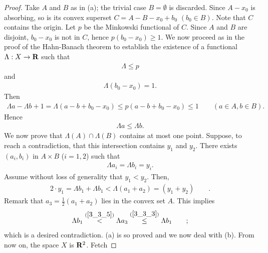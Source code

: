 \begin{proof}%
Take $A$ and $B$ as in (a); the trivial case $B=\emptyset$ is discarded. %
Since $A-x_0$ is absorbing, so is its convex superset %
%
  $C= A-B - x_0 + b_0$ $(b_0 \in B)$. %
%
Note that $C$ contains the origin. %
Let $p$ be the Minkowski functional of $C$. Since $A$ and $B$ are disjoint, %
$b_0-x_0$ is not in $C$, hence $p(b_0-x_0) \geq1$. %
We now proceed as in the proof of the Hahn-Banach theorem  %
to establish the existence of a functional %
%
  $\Lambda: X\to  \mathbf{R}$ such that %
%
  \begin{align}
    \Lambda \leq p %
  \end{align}
%
and %
%
  \begin{align}
    \Lambda(b_0-x_0) =1.
  \end{align}%
%
Then %
%
  \begin{align}
    \Lambda a -\Lambda b + 1 =\Lambda (a-b+ b_0-x_0) \leq p (a-b+ b_0-x_0) \leq 1\qquad (a\in A, b \in B).
  \end{align}
%
Hence %
%
  \begin{align}\label{3_3_3}
    \Lambda a \leq \Lambda b .
  \end{align}
%
We now prove that $\Lambda (A) \cap \Lambda (B) $ contains at most one point. %
Suppose, to reach a contradiction, that this intersection contains %
%
  $y_1$ and $y_2$. %
%
There exists %
%
  $(a_i, b_i)$ %
%
in $A\times B$ ($i=1, 2$) such that %
%
  \begin{align}\label{3_3_4}
    \Lambda a_i= \Lambda b_i = y_i .
  \end{align}
%
Assume without loss of generality that $y_1< y_2$. Then, %
%
  \begin{align}\label{3_3_5}
    2\cdot y_1= \Lambda b_1+  \Lambda b_1 < \Lambda ( a_1 + a_2) = (y_1+y_2)  \qquad .
  \end{align}
%
Remark that $a_3= \frac{1}{2} (a_1+ a_2)$ lies in the convex set $A$. %
This implies %
%
  \begin{align}
  \Lambda b_1 \overset{(\ref{3_3_5})}{<}  \Lambda a_3 \overset{(\ref{3_3_3})}{\leq} \Lambda b_1\qquad ;
  \end{align}
%
which is a desired contradiction. (a) is so proved and we now deal with (b). %
%
\skipline
%
From now on, the space $X$ is $\mathbf{R}^2$. Fetch %
%

\end{proof}
